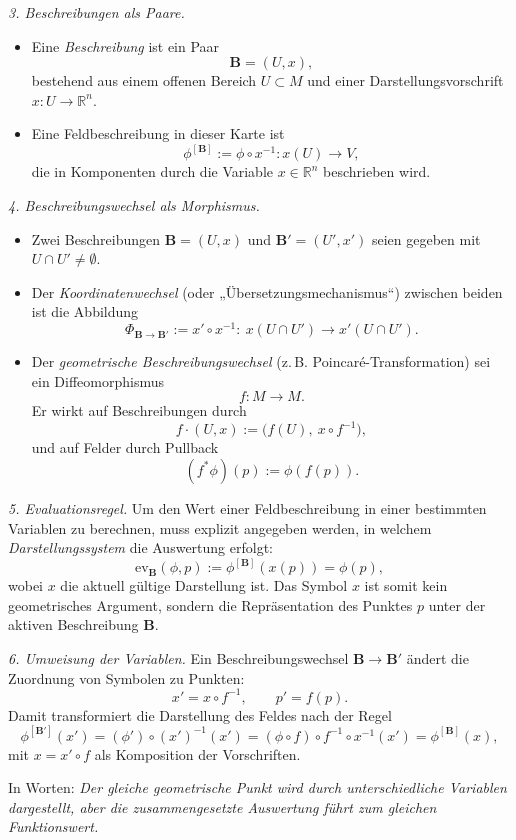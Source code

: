 \documentclass[10pt, letterpaper]{article}
\newcommand{\R}{\mathbb{R}}
\begin{document}
\bigskip
\emph{3. Beschreibungen als Paare.}
\begin{itemize}
\item Eine \emph{Beschreibung} ist ein Paar
\[
\mathbf{B} = (U,x),
\]
bestehend aus einem offenen Bereich $U\subset M$ und einer Darstellungsvorschrift $x:U\to\R^n$.
\item Eine Feldbeschreibung in dieser Karte ist
\[
\phi^{[\mathbf B]} := \phi\circ x^{-1} : x(U)\to V,
\]
die in Komponenten durch die Variable $x\in\R^n$ beschrieben wird.
\end{itemize}

\bigskip
\emph{4. Beschreibungswechsel als Morphismus.}
\begin{itemize}
\item Zwei Beschreibungen $\mathbf B=(U,x)$ und $\mathbf B'=(U',x')$
seien gegeben mit $U\cap U'\ne\emptyset$.
\item Der \emph{Koordinatenwechsel} (oder „Übersetzungsmechanismus“) zwischen beiden ist die Abbildung
\[
\Phi_{\mathbf{B}\to\mathbf{B}'} := x'\circ x^{-1}:\ x(U\cap U')\longrightarrow x'(U\cap U').
\]
\item Der \emph{geometrische Beschreibungswechsel} (z.\,B. Poincaré-Transformation) sei ein Diffeomorphismus
\[
f:M\to M.
\]
Er wirkt auf Beschreibungen durch
\[
f\cdot(U,x) := \big(f(U),\ x\circ f^{-1}\big),
\]
und auf Felder durch Pullback
\[
(f^*\phi)(p) := \phi(f(p)).
\]
\end{itemize}

\bigskip
\emph{5. Evaluationsregel.}
Um den Wert einer Feldbeschreibung in einer bestimmten Variablen zu berechnen,
muss explizit angegeben werden, in welchem \emph{Darstellungssystem} die Auswertung erfolgt:
\[
\mathrm{ev}_{\mathbf B}(\phi,p) := \phi^{[\mathbf B]}(x(p)) = \phi(p),
\]
wobei $x$ die aktuell gültige Darstellung ist.  
Das Symbol $x$ ist somit kein geometrisches Argument, sondern die Repräsentation des Punktes $p$
unter der aktiven Beschreibung $\mathbf B$.

\bigskip
\emph{6. Umweisung der Variablen.}
Ein Beschreibungswechsel $\mathbf B\to\mathbf B'$ ändert die Zuordnung von Symbolen zu Punkten:
\[
x' = x\circ f^{-1},\qquad
p' = f(p).
\]
Damit transformiert die Darstellung des Feldes nach der Regel
\[
\phi^{[\mathbf B']}(x') 
= (\phi')\circ (x')^{-1}(x')
= (\phi\circ f)\circ f^{-1}\circ x^{-1}(x')
= \phi^{[\mathbf B]}(x),
\]
mit $x=x'\circ f$ als Komposition der Vorschriften.

In Worten:
\emph{Der gleiche geometrische Punkt wird durch unterschiedliche Variablen dargestellt,
aber die zusammengesetzte Auswertung führt zum gleichen Funktionswert.}
\end{document}
